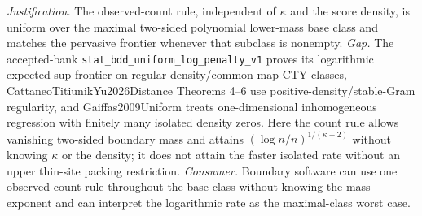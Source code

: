 \documentclass{article}
\begin{document}
\par\smallskip\noindent \textit{Justification.} The observed-count rule, independent of \(\kappa\) and the score density, is uniform over the maximal two-sided polynomial lower-mass base class and matches the pervasive frontier whenever that subclass is nonempty. \textit{Gap.} The accepted-bank \texttt{stat\_bdd\_uniform\_log\_penalty\_v1} proves its logarithmic expected-sup frontier on regular-density/common-map CTY classes, CattaneoTitiunikYu2026Distance Theorems 4--6 use positive-density/stable-Gram regularity, and Gaiffas2009Uniform treats one-dimensional inhomogeneous regression with finitely many isolated density zeros. Here the count rule allows vanishing two-sided boundary mass and attains \((\log n/n)^{1/(\kappa+2)}\) without knowing \(\kappa\) or the density; it does not attain the faster isolated rate without an upper thin-site packing restriction. \textit{Consumer.} Boundary software can use one observed-count rule throughout the base class without knowing the mass exponent and can interpret the logarithmic rate as the maximal-class worst case.
\end{document}

